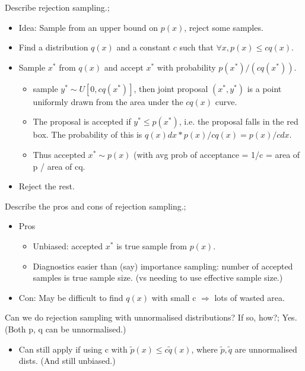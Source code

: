 \documentclass{article}
\begin{document}
Describe rejection sampling.; \begin{itemize} \item Idea: Sample from an upper bound on $p(x)$, reject some samples. \item Find a distribution $q(x)$ and a constant $c$ such that $\forall x, p(x) \leq cq(x)$. \item Sample $x^*$ from $q(x)$ and accept $x^*$ with probability $p(x^*)/(cq(x^*))$. \begin{itemize} \item sample $y^* \sim U[0, cq(x^*)]$, then joint proposal $(x^*, y^*)$ is a point uniformly drawn from the area under the $cq(x)$ curve. \item The proposal is accepted if $y^* \leq p(x^*)$, i.e. the proposal falls in the red box. The probability of this is $q(x)dx * p(x) / cq(x) = p(x)/c dx$. \item Thus accepted $x^* \sim p(x)$ (with avg prob of acceptance = 1/c = area of p / area of cq. \end{itemize} \item Reject the rest. \end{itemize}

Describe the pros and cons of rejection sampling.; \begin{itemize} \item Pros \begin{itemize} \item Unbiased: accepted $x^*$ is true sample from $p(x)$. \item Diagnostics easier than (say) importance sampling: number of accepted samples is true sample size. (vs needing to use effective sample size.) \end{itemize} \item Con: May be difficult to find $q(x)$ with small c $\Rightarrow$ lots of wasted area. \end{itemize}

Can we do rejection sampling with unnormalised distributions? If so, how?; Yes. (Both p, q can be unnormalised.) \begin{itemize} \item Can still apply if using c with $\tilde{p}(x) \leq c\tilde{q}(x)$, where $\tilde{p}, \tilde{q}$ are unnormalised dists. (And still unbiased.) \end{itemize}  
\end{document}
